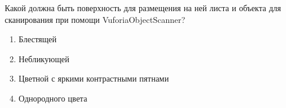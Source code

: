 
Какой должна быть поверхность для размещения на ней листа и объекта для сканирования при помощи VuforiaObjectScanner?

\begin{enumerate}
    \item Блестящей
    \item Небликующей
    \item Цветной с яркими контрастными пятнами
    \item Однородного цвета
\end{enumerate}

